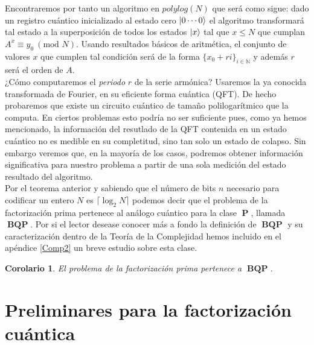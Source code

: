 \documentclass[11pt, spanish]{report}
\numberwithin{equation}{section}
\newtheorem{corol}[defin]{Corolario}
\numberwithin{defin}{section}
\DeclareMathOperator{\PP}{\mathbf{P}}
\DeclareMathOperator{\BQP}{\mathbf{BQP}}
\newenvironment{yellowBox}{\begin{tcolorbox}[colback=yellow!5!white,colframe=yellow!75!black]}{\end{tcolorbox}}
\begin{document}
Encontraremos por tanto un algoritmo en $polylog(N)$ que será como sigue: dado un registro cuántico inicializado al estado cero $\ket{0\cdots 0}$ el algoritmo transformará tal estado a la superposición de todos los estados $\ket{x}$ tal que $x\leq N$ que cumplan $A^x\equiv y_0\ (\text{mod } N)$. Usando resultados básicos de aritmética, el conjunto de valores $x$ que cumplen tal condición será de la forma $\{x_0+ri\}_{i \in \mathbb{N}}$ y además $r$ será el orden de $A$.\\

¿Cómo computaremos el \textit{periodo} $r$ de la serie armónica? Usaremos la ya conocida transformada de Fourier, en su eficiente forma cuántica (QFT). De hecho probaremos que existe un circuito cuántico de tamaño polilogarítmico que la computa. En ciertos problemas esto podría no ser suficiente pues, como ya hemos mencionado, la información del resutlado de la QFT contenida en un estado cuántico no es medible en su completitud, sino tan solo un estado de colapso. Sin embargo veremos que, en la mayoría de los casos, podremos obtener información significativa para nuestro problema a partir de una sola medición del estado resultado del algoritmo. \\


Por el teorema anterior y sabiendo que el número de bits $n$ necesario para codificar un entero $N$ es $\lceil \log_2 N\rceil$ podemos decir que el problema de la factorización prima pertenece al análogo cuántico para la clase $\PP$, llamada $\BQP$. Por si el lector desease conocer más a fondo la definición de $\BQP$ y su caracterización dentro de la Teoría de la Complejidad hemos incluido en el apéndice \ref{Comp2} un breve estudio sobre esta clase.\\

\begin{yellowBox}
\begin{corol} El problema de la factorización prima pertenece a $\BQP$.
\end{corol}
\end{yellowBox}

\section{Preliminares para la factorización cuántica} 
\end{document}
